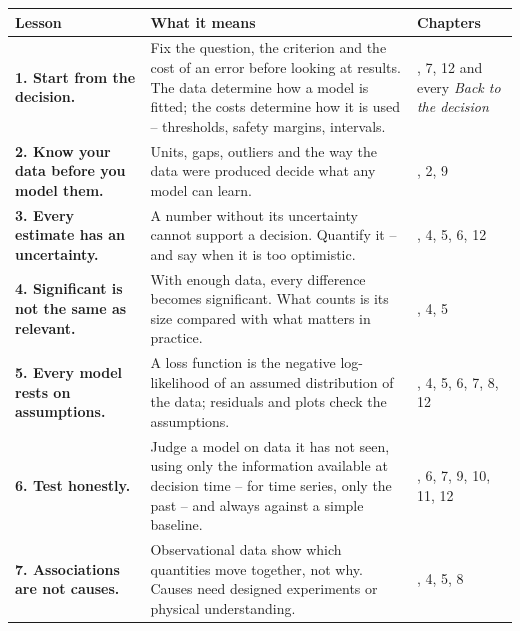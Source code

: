 \documentclass[
  letterpaper,
  DIV=11,
  numbers=noendperiod]{scrreprt}
\begin{document}
\begin{longtable}[]{@{}
  >{\raggedright\arraybackslash}p{}
  >{\raggedright\arraybackslash}p{}
  >{\raggedright\arraybackslash}p{}@{}}
\toprule\noalign{}
\begin{minipage}[b]{\linewidth}\raggedright
Lesson
\end{minipage} & \begin{minipage}[b]{\linewidth}\raggedright
What it means
\end{minipage} & \begin{minipage}[b]{\linewidth}\raggedright
Chapters
\end{minipage} \\
\midrule\noalign{}
\endhead
\bottomrule\noalign{}
\endlastfoot
\textbf{1. Start from the decision.} & Fix the question, the criterion
and the cost of an error before looking at results. The data determine
how a model is fitted; the costs determine how it is used -- thresholds,
safety margins, intervals. & 1, 7, 12 and every \emph{Back to the
decision} \\
\textbf{2. Know your data before you model them.} & Units, gaps,
outliers and the way the data were produced decide what any model can
learn. & 1, 2, 9 \\
\textbf{3. Every estimate has an uncertainty.} & A number without its
uncertainty cannot support a decision. Quantify it -- and say when it is
too optimistic. & 3, 4, 5, 6, 12 \\
\textbf{4. Significant is not the same as relevant.} & With enough data,
every difference becomes significant. What counts is its size compared
with what matters in practice. & 2, 4, 5 \\
\textbf{5. Every model rests on assumptions.} & A loss function is the
negative log-likelihood of an assumed distribution of the data;
residuals and plots check the assumptions. & 3, 4, 5, 6, 7, 8, 12 \\
\textbf{6. Test honestly.} & Judge a model on data it has not seen,
using only the information available at decision time -- for time
series, only the past -- and always against a simple baseline. & 1, 6,
7, 9, 10, 11, 12 \\
\textbf{7. Associations are not causes.} & Observational data show which
quantities move together, not why. Causes need designed experiments or
physical understanding. & 1, 4, 5, 8 \\
\end{longtable}
\end{document}

